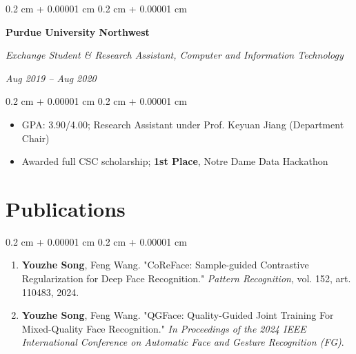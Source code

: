 \documentclass[10pt, letterpaper]{article}
\newenvironment{highlights}{
    \begin{itemize}[
        topsep=0.05 cm,
        parsep=0.05 cm,
        partopsep=0pt,
        itemsep=0pt,
        leftmargin=0.4 cm + 10pt
    ]
}{
    \end{itemize}
} %
\newenvironment{onecolentry}{
    \begin{adjustwidth}{
        0.2 cm + 0.00001 cm
    }{
        0.2 cm + 0.00001 cm
    }
}{
    \end{adjustwidth}
} %
\newenvironment{twocolentry}[2][]{
    \onecolentry
    \def\secondColumn{#2}
    \setcolumnwidth{\fill, 4.5 cm}
    \begin{paracol}{2}
}{
    \switchcolumn \raggedleft \secondColumn
    \end{paracol}
    \endonecolentry
} %
\begin{document}
        \begin{twocolentry}{
            \textit{Aug 2019 – Aug 2020}}
            \textbf{Purdue University Northwest}

            \textit{Exchange Student \& Research Assistant, Computer and Information Technology}
        \end{twocolentry}
        \begin{onecolentry}
            \begin{highlights}
                \item GPA: 3.90/4.00; Research Assistant under Prof. Keyuan Jiang (Department Chair)
                \item Awarded full CSC scholarship; \textbf{1st Place}, Notre Dame Data Hackathon
            \end{highlights}
        \end{onecolentry}
        
    \section{Publications}
        \begin{onecolentry}
            \begin{enumerate}[
                label=\arabic*.,
                topsep=0pt,
                parsep=0pt,
                partopsep=0pt,
                itemsep=0.1cm,
                leftmargin=*
            ]
                \item \textbf{Youzhe Song}, Feng Wang. "CoReFace: Sample-guided Contrastive Regularization for Deep Face Recognition." \textit{Pattern Recognition}, vol. 152, art. 110483, 2024.
                \href{https://doi.org/10.1016/j.patcog.2024.110483}{\faLink}
                \href{https://github.com/IsidoreSong/CoreFace}{\faGithub}
                
                \item \textbf{Youzhe Song}, Feng Wang. "QGFace: Quality-Guided Joint Training For Mixed-Quality Face Recognition." \textit{In Proceedings of the 2024 IEEE International Conference on Automatic Face and Gesture Recognition (FG)}.
                \href{https://arxiv.org/abs/2312.17494}{\faLink}
                \href{https://github.com/IsidoreSong/QGFace}{\faGithub}
            \end{enumerate}
        \end{onecolentry}
\end{document}
